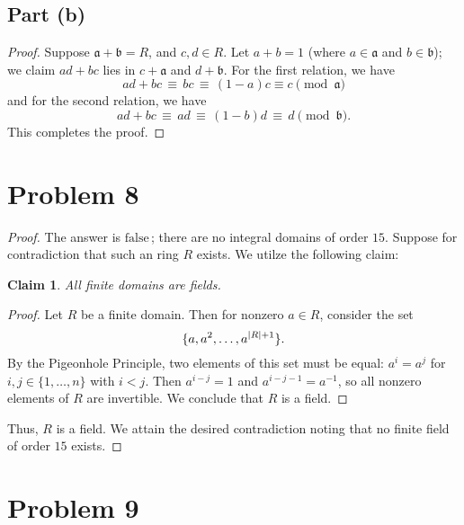 \documentclass[11pt]{article}
\newtheorem{claim}{Claim}
\begin{document}
\subsection*{Part (b)}

\begin{proof}
  Suppose $\mathfrak{a} + \mathfrak{b} = R$, and $c, d \in R$. Let $a + b = 1$ (where $a \in \mathfrak{a}$ and $b \in \mathfrak{b}$); we claim $\boxed{ad + bc}$ lies in $c + \mathfrak{a}$ and $d + \mathfrak{b}$. For the first relation, we have
  \[
    ad + bc \, \equiv \, bc \, \equiv \, (1 - a)c \equiv c \pmod{\mathfrak{a}}
  \]
  and for the second relation, we have
  \[
    ad + bc \, \equiv \, ad \, \equiv \, (1 - b)d \, \equiv \, d \pmod{\mathfrak{b}}.
  \]
  This completes the proof.
\end{proof}


\section{Problem 8}

\begin{proof}
  The answer is $\boxed{\text{false}}$\,; there are no integral domains of order $15$. Suppose for contradiction that such an ring $R$ exists. We utilze the following claim:
  \begin{adjustwidth}{1cm}{}
	  \begin{claim}
		  All finite domains are fields.
	  \end{claim}
	  \begin{proof}\renewcommand{\qedsymbol}{}
		  Let $R$ be a finite domain. Then for nonzero $a \in R$, consider the set
		  \[
			  \{ a, a^{2}, \ldots, a^{\abs{R} + 1} \}.
		  \]
		  By the Pigeonhole Principle, two elements of this set must be equal: $a^{i} = a^{j}$ for $i, j \in \{ 1, \ldots, n \}$ with $i < j$. Then $a^{i - j} = 1$ and $a^{i - j - 1} = a^{-1}$, so all nonzero elements of $R$ are invertible. We conclude that $R$ is a field.
	  \end{proof}
  \end{adjustwidth}
  Thus, $R$ is a field. We attain the desired contradiction noting that no finite field of order $15$ exists.
\end{proof}


\section{Problem 9}
\end{document}
